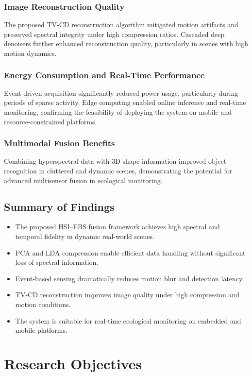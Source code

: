 \documentclass[conference]{IEEEtran}
\begin{document}
\subsubsection{Image Reconstruction Quality}
The proposed TV-CD reconstruction algorithm mitigated motion artifacts and preserved spectral integrity under high compression ratios. Cascaded deep denoisers further enhanced reconstruction quality, particularly in scenes with high motion dynamics.

\subsubsection{Energy Consumption and Real-Time Performance}
Event-driven acquisition significantly reduced power usage, particularly during periods of sparse activity. Edge computing enabled online inference and real-time monitoring, confirming the feasibility of deploying the system on mobile and resource-constrained platforms.

\subsubsection{Multimodal Fusion Benefits}
Combining hyperspectral data with 3D shape information improved object recognition in cluttered and dynamic scenes, demonstrating the potential for advanced multisensor fusion in ecological monitoring.

\subsection{Summary of Findings}
\begin{itemize}
    \item The proposed HSI–EBS fusion framework achieves high spectral and temporal fidelity in dynamic real-world scenes.
    \item PCA and LDA compression enable efficient data handling without significant loss of spectral information.
    \item Event-based sensing dramatically reduces motion blur and detection latency.
    \item TV-CD reconstruction improves image quality under high compression and motion conditions.
    \item The system is suitable for real-time ecological monitoring on embedded and mobile platforms.
\end{itemize}




\section{Research Objectives}
\end{document}
